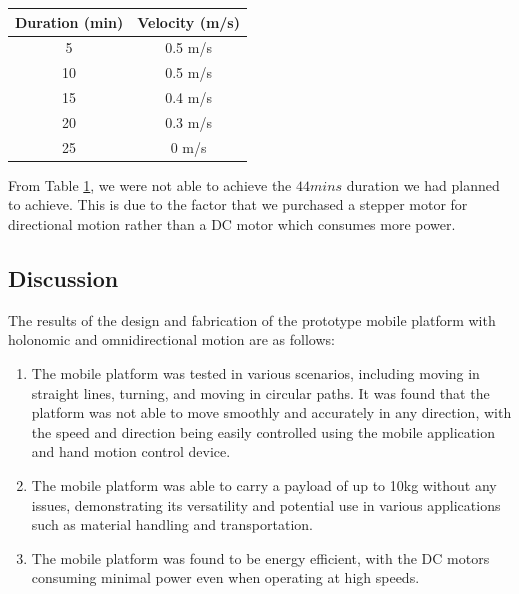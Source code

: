 \begin{table}[ht]
  \begin{center}
    \leavevmode
    \label{table:timetorunplatform}
\begin{tabular}{ |c|c| } 
 \hline
 Duration (min) & Velocity (m/s) \\ \hline 
 5 & 0.5 m/s \\ \hline
 10 & 0.5 m/s \\ \hline
 15 & 0.4 m/s \\ \hline
 20 & 0.3 m/s \\ \hline 
 25 & 0 m/s \\ \hline
\end{tabular}
\label{table:timetorunplatform}
  \end{center}
\end{table}

From Table \ref{table:timetorunplatform}, we were not able to achieve the ${44 mins}$ duration we had planned to achieve. This is due to the factor that we purchased a stepper motor for directional motion rather than a DC motor which consumes more power.

\subsection{Discussion}

The results of the design and fabrication of the prototype mobile platform with holonomic and omnidirectional motion are as follows:

\begin{enumerate}
    \item The mobile platform was tested in various scenarios, including moving in straight lines, turning, and moving in circular paths. It was found that the platform was not able to move smoothly and accurately in any direction, with the speed and direction being easily controlled using the mobile application and hand motion control device.
    \item The mobile platform was able to carry a payload of up to 10kg without any issues, demonstrating its versatility and potential use in various applications such as material handling and transportation.
    \item The mobile platform was found to be energy efficient, with the DC motors consuming minimal power even when operating at high speeds.    
\end{enumerate}


